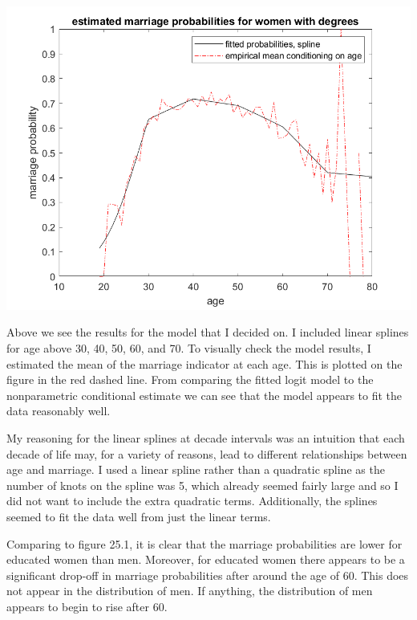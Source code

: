 \documentclass[11pt]{article} %
\begin{document}
\includegraphics{fig1}

Above we see the results for the model that I decided on. I included linear splines for age above 30, 40, 50, 60, and 70. To visually check the model results, I estimated the mean of the marriage indicator at each age. This is plotted on the figure in the red dashed line. From comparing the fitted logit model to the nonparametric conditional estimate we can see that the model appears to fit the data reasonably well.

My reasoning for the linear splines at decade intervals was an intuition that each decade of life may, for a variety of reasons, lead to different relationships between age and marriage. I used a linear spline rather than a quadratic spline as the number of knots on the spline was 5, which already seemed fairly large and so I did not want to include the extra quadratic terms. Additionally, the splines seemed to fit the data well from just the linear terms. 

Comparing to figure 25.1, it is clear that the marriage probabilities are lower for educated women than men. Moreover, for educated women there appears to be a significant drop-off in marriage probabilities after around the age of 60. This does not appear in the distribution of men. If anything, the distribution of men appears to begin to rise after 60.
\end{document}

